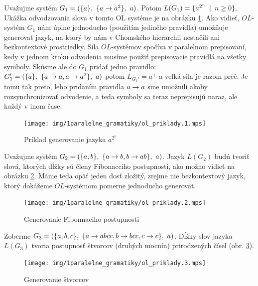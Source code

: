 \begin{priklad}
    Uvažujme systém $G_1=(\{ a \},\ \{ a \rightarrow a^2\},\ a)$.
    Potom $L(G_1)=\{ a^{2^n} \enspace |\enspace n \ge 0\}$.
    Ukážka odvodzovania slova v tomto OL systéme je na obrázku 
    \ref{img:ol_priklad_1}.
    Ako vidieť, $OL$-systém $G_1$ nám úplne jednoducho 
    (použitím jediného pravidla) umožňuje
    generovať jazyk, na ktorý by nám v Chomského hierarchii
    nestačili ani bezkontextové prostriedky.
    Sila $OL$-systémov spočíva v paralelnom prepisovaní,
    kedy v jednom kroku odvodenia
    musíme použiť prepisovacie pravidlá na všetky symboly.
    Skúsme ale do $G_1$ pridať jedno pravidlo:\\
    $G_{1}'=(\{ a \},\ \{ a\rightarrow a,
    a \rightarrow a^2 \},\ a)$ potom $L_{G_1'}=a^{+}$ a veľká sila je razom
    preč. Je tomu tak preto, lebo pridaním pravidla $a\rightarrow a$ sme
    umožnili akoby rozsynchronizovať odvodenie, a teda symboly sa
    teraz neprepisujú naraz, ale každý v inom čase.

    \begin{figure}[htp]
        \centering
        \texttt{[image: img/1paralelne\_gramatiky/ol\_priklady.1.mps]}
        \caption{Príklad generovanie jazyka $a^{2^n}$}
        \label{img:ol_priklad_1}
    \end{figure}
\end{priklad}


\begin{priklad}
    Uvažujme systém $G_{2}=(\{a,b\},\ \{ a \rightarrow b, b \rightarrow ab \},
        \ a)$.
    Jazyk $L(G_{2})$ budú
    tvoriť slová, ktorých dĺžky sú členy Fibonacciho postupnosti, ako
    možno vidieť na obrázku \ref{img:ol_priklad_2}. Máme teda
    opäť jeden dosť zložitý, zrejme nie bezkontextový jazyk,
    ktorý dokážeme $OL$-systémom pomerne jednoducho generovať.
    \begin{figure}[htp]
        \centering
        \texttt{[image: img/1paralelne\_gramatiky/ol\_priklady.2.mps]}
        \caption{Generovanie Fibonnaciho postupnosťi}
        \label{img:ol_priklad_2}
    \end{figure}
\end{priklad}


\begin{priklad}
    Zoberme $G_3=(\{a,b,c\},\ \{a \rightarrow abcc,b \rightarrow bcc,
        c \rightarrow c\},\ a)$. Dĺžky
    slov jazyka $L(G_3)$ tvoria postupnosť štvorcov (druhých mocnín)
    prirodzených čísel (obr. \ref{img:ol_priklad_3}).

    \begin{figure}[htp]
        \centering
        \texttt{[image: img/1paralelne\_gramatiky/ol\_priklady.3.mps]}
        \caption{Generovanie štvorcov}
        \label{img:ol_priklad_3}
    \end{figure}
\end{priklad}

